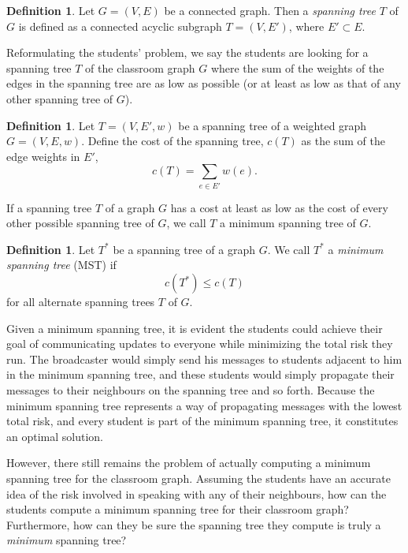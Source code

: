 \documentclass[a4paper,11pt]{report}
\theoremstyle{plain}
\theoremstyle{definition}
\newtheorem{defn}[thm]{Definition}
\begin{document}
\begin{defn}
Let $G = (V, E)$ be a connected graph. Then a \emph{spanning tree} $T$ of $G$
is defined as a connected acyclic subgraph $T = (V, E')$, where $E' \subset
E$.
\end{defn}

Reformulating the students' problem, we say the students are looking for a
spanning tree $T$ of the classroom graph $G$ where the sum of the weights of
the edges in the spanning tree are as low as possible (or at least as low as
that of any other spanning tree of $G$).

\begin{defn}
Let $T = (V, E', w)$ be a spanning tree of a weighted graph $G = (V, E, w)$.
Define the cost of the spanning tree, $c(T)$ as the sum of the edge weights in
$E'$,
\begin{equation*}
    c(T) = \sum_{e \in E'}{w(e)}.
\end{equation*}
\end{defn}

If a spanning tree $T$ of a graph $G$ has a cost at least as low as the
cost of every other possible spanning tree of $G$, we call $T$ a minimum
spanning tree of $G$.

\begin{defn} Let $T^*$ be a spanning tree of a graph $G$. We call $T^*$ a
\emph{minimum spanning tree} (MST) if
\begin{equation*}
    c(T^*) \leq c(T)
\end{equation*}
for all alternate spanning trees $T$ of $G$.
\end{defn}

Given a minimum spanning tree, it is evident the students could achieve their
goal of communicating updates to everyone while minimizing the total risk they
run. The broadcaster would simply send his messages to students adjacent to
him in the minimum spanning tree, and these students would simply propagate
their messages to their neighbours on the spanning tree and so forth. Because
the minimum spanning tree represents a way of propagating messages with the
lowest total risk, and every student is part of the minimum spanning tree, it
constitutes an optimal solution.

However, there still remains the problem of actually computing a minimum
spanning tree for the classroom graph. Assuming the students have an accurate
idea of the risk involved in speaking with any of their neighbours, how can the
students compute a minimum spanning tree for their classroom graph?
Furthermore, how can they be sure the spanning tree they compute is truly a
\emph{minimum} spanning tree?
\end{document}
